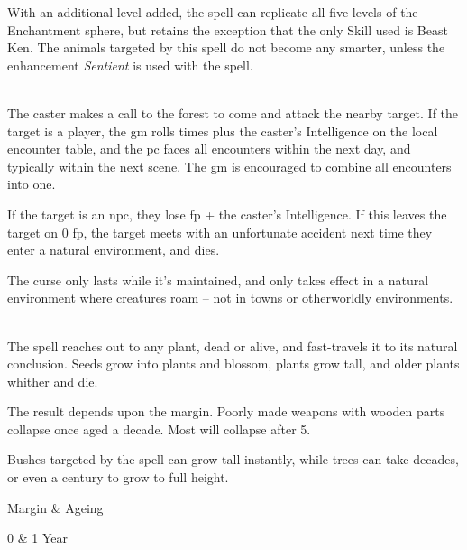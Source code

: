 \begin{multicols}{2}

With an additional level added, the spell can replicate all five levels of the Enchantment sphere, but retains the exception that the only Skill used is Beast Ken.
The animals targeted by this spell do not become any smarter, unless the enhancement \textit{Sentient} is used with the spell.

\spelllevel

\\
\label{forestsCall}%
The caster makes a call to the forest to come and attack the nearby target.  If the target is a player, the \gls{gm} rolls  times plus the caster's Intelligence on the local encounter table, and the \gls{pc} faces all encounters within the next day, and typically within the next scene.  The \gls{gm} is encouraged to combine all encounters into one.

If the target is an \gls{npc}, they lose  \gls{fp} + the caster's Intelligence.
If this leaves the target on 0 \gls{fp}, the target meets with an unfortunate accident next time they enter a natural environment, and dies.

The curse only lasts while it's maintained, and only takes effect in a natural environment where creatures roam -- not in towns or otherworldly environments.

\\
The spell reaches out to any plant, dead or alive, and fast-travels it to its natural conclusion.
Seeds grow into plants and blossom, plants grow tall, and older plants whither and die.

The result depends upon the margin.
Poorly made weapons with wooden parts collapse once aged a decade.
Most will collapse after 5.

Bushes targeted by the spell can grow tall instantly, while trees can take decades, or even a century to grow to full height.

\begin{sidebox}

	\begin{rollchart}

		Margin & Ageing \\\hline
	
		0 & 1 Year \\
	

\end{rollchart}
\end{sidebox}
\end{multicols}

